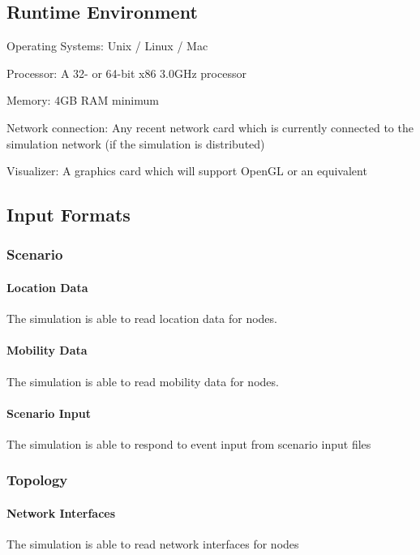 \documentclass[titlepage]{article}
\begin{document}
\subsection{Runtime Environment} 
\begin{itemize*}
    \item Operating Systems:  Unix / Linux / Mac
    \item Processor:  A 32- or 64-bit x86 3.0GHz processor
    \item Memory:  4GB RAM minimum
    \item Network connection:  Any recent network card which is currently connected to the simulation network (if the simulation is distributed)
    \item Visualizer:  A graphics card which will support OpenGL or an equivalent
\end{itemize*}


\subsection{Input Formats%
  \label{input-formats}%
}

\subsubsection{Scenario}
    \paragraph{Location Data} The simulation is able to read location data for nodes.
	\paragraph{Mobility Data} The simulation is able to read mobility data for nodes.
	\paragraph{Scenario Input} The simulation is able to respond to event input from scenario input files

\subsubsection{Topology}
    \paragraph{Network Interfaces} The simulation is able to read network interfaces for nodes
\end{document}

